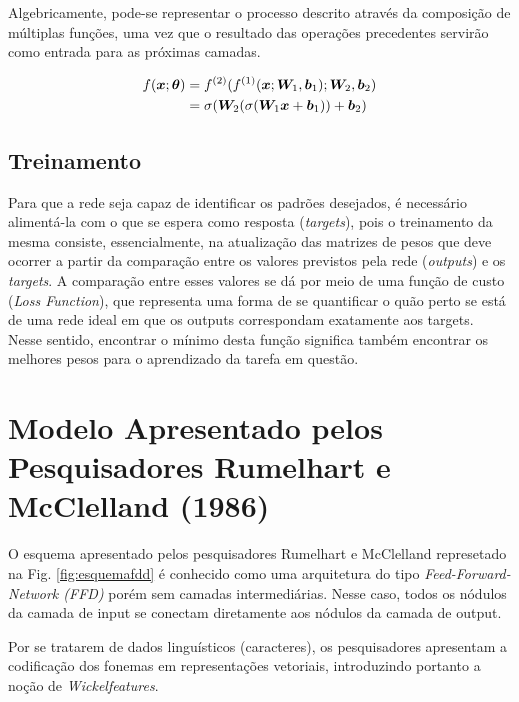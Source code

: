 Algebricamente, pode-se representar o processo descrito através da composição de múltiplas funções, uma vez que o resultado das operações precedentes servirão como entrada para as próximas camadas.

\begin{align}
f(\bm{x}; \bm{\theta}) &= f^{(2)}(f^{(1)}(\bm{x}; \bm{W}_1, \bm{b}_1); \bm{W}_2, \bm{b}_2)\\
&= \sigma(\bm{W}_2 (\sigma(\bm{W}_1\bm{x} + \bm{b}_1)) + \bm{b}_2)
\end{align}

\subsection{Treinamento}

Para que a rede seja capaz de identificar os padrões desejados, é necessário alimentá-la com o que se espera como resposta (\textit{targets}), pois o treinamento da mesma consiste, essencialmente, na atualização das matrizes de pesos que deve ocorrer a partir da comparação entre os valores previstos pela rede (\textit{outputs}) e os \textit{targets}. A comparação entre esses valores se dá por meio de uma função de custo (\textit{Loss Function}), que representa uma forma de se quantificar o quão perto se está de uma rede ideal em que os outputs correspondam exatamente aos targets. Nesse sentido, encontrar o mínimo desta função significa também encontrar os melhores pesos para o aprendizado da tarefa em questão.

\section{Modelo Apresentado pelos Pesquisadores Rumelhart e McClelland (1986)}

O esquema apresentado pelos pesquisadores Rumelhart e McClelland represetado na Fig. \ref{fig:esquemafdd} é conhecido como uma arquitetura do tipo \textit{Feed-Forward-Network (FFD)} porém sem camadas intermediárias. Nesse caso, todos os nódulos da camada de input se conectam diretamente aos nódulos da camada de output.

Por se tratarem de dados linguísticos (caracteres), os pesquisadores apresentam a codificação dos fonemas em representações vetoriais, introduzindo portanto a noção de \textit{Wickelfeatures}.


